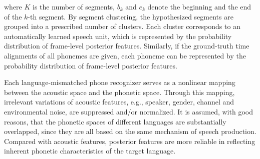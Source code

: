 \documentclass[a4paper]{article}
\begin{document}
where $K$ is the number of segments, $b_k$ and $e_k$ denote the beginning and the end of the $k$-th segment.
By segment clustering, the hypothesized segments are grouped into a prescribed number of clusters.
Each cluster corresponds to an automatically learned speech unit, which is represented by the probability distribution of frame-level posterior features. Similarly, if the ground-truth time alignments of all phonemes are given, each phoneme can be represented by the probability distribution of frame-level posterior features.

Each language-mismatched phone recognizer serves as a nonlinear mapping between the acoustic space and the phonetic space. Through this mapping, irrelevant variations of acoustic features, e.g., speaker, gender, channel and environmental noise, are suppressed and/or normalized. 
It is assumed, with good reasons, that the phonetic spaces of different languages are substantially overlapped, since they are all based on the same mechanism of speech production. Compared with acoustic features, posterior features are more reliable in reflecting inherent phonetic characteristics of the target language.



\end{document}
